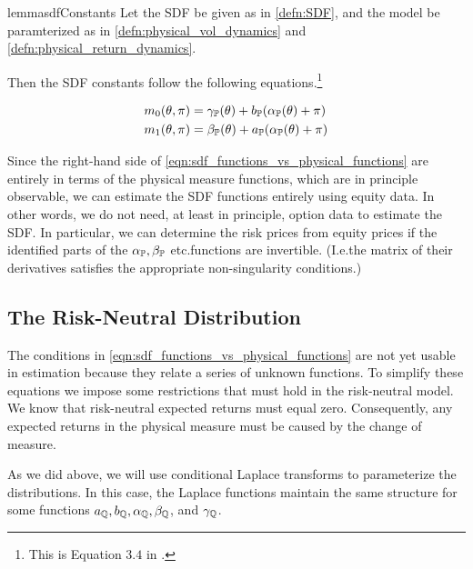 \documentclass[11pt, letterpaper, twoside, final]{article}
\begin{document}
\begin{restatable}{lemma}{sdfConstants}
    Let the SDF be given as in \cref{defn:SDF}, and the model be paramterized as in
    \cref{defn:physical_vol_dynamics} and \cref{defn:physical_return_dynamics}.

    Then the SDF constants follow the following equations.\footnote{This is Equation $3.4$ in
    \textcite[3.4]{khrapov2016affine}.}

    \begin{align}
        \label{eqn:sdf_functions_vs_physical_functions}
        m_0(\theta, \pi)  &= \gamma_{\mathbb{P}}(\theta) + b_{\mathbb{P}}(\alpha_{\mathbb{P}}(\theta) + \pi) \\
        m_1(\theta, \pi)  &= \beta_{\mathbb{P}}(\theta) + a_{\mathbb{P}}(\alpha_{\mathbb{P}}(\theta) + \pi) \nonumber
    \end{align}

\end{restatable}


Since the right-hand side of \cref{eqn:sdf_functions_vs_physical_functions} are entirely in terms of the physical
measure functions, which are in principle observable, we can estimate the SDF functions entirely using equity
data.
In other words, we do not need, at least in principle, option data to estimate the SDF.
In particular, we can determine the risk prices from equity prices if the identified parts of the $\alpha_{\mathbb{P}},
\beta_{\mathbb{P}}$ etc.\@ functions are  invertible.
(I.e.\@ the matrix of their derivatives satisfies the appropriate non-singularity conditions.)

\subsection{The Risk-Neutral Distribution}

The conditions in \cref{eqn:sdf_functions_vs_physical_functions} are not yet usable in estimation because they
relate a series of unknown functions.
To simplify these equations we impose some restrictions that must hold in the risk-neutral model. 
We know that risk-neutral expected returns must equal zero.
Consequently, any expected returns in the physical measure must be caused by the change of measure.

As we did above, we will use conditional Laplace transforms to parameterize the distributions.
In this case, the Laplace functions maintain the same structure for some functions $a_{\mathbb{Q}}, b_{\mathbb{Q}},
\alpha_{\mathbb{Q}}, \beta_{\mathbb{Q}}$, and $\gamma_{\mathbb{Q}}$.
\end{document}
